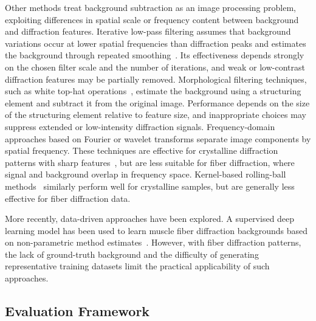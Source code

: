 \documentclass[iucr]{iucrjournals}
\begin{document}
Other methods treat background subtraction as an image processing problem, exploiting differences in spatial scale or frequency content between background and diffraction features. Iterative low-pass filtering assumes that background variations occur at lower spatial frequencies than diffraction peaks and estimates the background through repeated smoothing~\cite{IvanovaMakowski1998}. Its effectiveness depends strongly on the chosen filter scale and the number of iterations, and weak or low-contrast diffraction features may be partially removed. Morphological filtering techniques, such as white top-hat operations~\cite{GonzalezWoodsDIP4e}, estimate the background using a structuring element and subtract it from the original image. Performance depends on the size of the structuring element relative to feature size, and inappropriate choices may suppress extended or low-intensity diffraction signals. Frequency-domain approaches based on Fourier or wavelet transforms separate image components by spatial frequency. These techniques are effective for crystalline diffraction patterns with sharp features~\cite{PolarBackground2024, WaveletBiomedOptExpress2021, renedecotret2017baseline}, but are less suitable for fiber diffraction, where signal and background overlap in frequency space. Kernel-based rolling-ball methods~\cite{Sternberg1983} similarly perform well for crystalline samples, but are generally less effective for fiber diffraction data.

More recently, data-driven approaches have been explored. A supervised deep learning model has been used to learn muscle fiber diffraction backgrounds based on non-parametric method estimates~\cite{ArangurenCarmona2020}. However, with fiber diffraction patterns, the lack of ground-truth background and the difficulty of generating representative training datasets limit the practical applicability of such approaches.

\subsection{Evaluation Framework}
\end{document}
